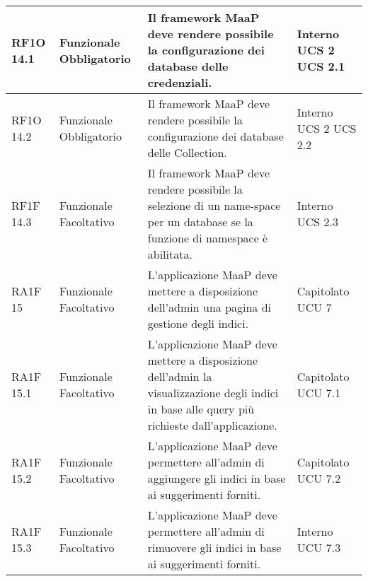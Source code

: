 \begin{center}
\begin{longtable}{ | l | p{2cm} | p{5cm} | p{1.7cm} |}
        RF1O 14.1 & Funzionale \newline  Obbligatorio  & Il framework MaaP deve rendere possibile la configurazione dei database delle credenziali. &  Interno \newline  UCS 2 \newline  UCS 2.1 \newline  \\ \hline      
        RF1O 14.2 & Funzionale \newline  Obbligatorio  & Il framework MaaP deve rendere possibile la configurazione dei database delle Collection. &  Interno \newline  UCS 2 \newline  UCS 2.2 \newline  \\ \hline      
        RF1F 14.3 & Funzionale \newline  Facoltativo  & Il framework MaaP deve rendere possibile la selezione di un name-space per un database se la funzione di namespace è abilitata. &  Interno \newline  UCS 2.3 \newline  \\ \hline      
        RA1F 15 & Funzionale \newline  Facoltativo  & L’applicazione MaaP deve mettere a disposizione dell’admin una pagina di gestione degli indici. &  Capitolato \newline  UCU 7 \newline  \\ \hline      
        RA1F 15.1 & Funzionale \newline  Facoltativo  & L’applicazione MaaP deve mettere a disposizione dell’admin la visualizzazione degli indici in base alle query più richieste dall’applicazione. &  Capitolato \newline  UCU 7.1 \newline  \\ \hline      
        RA1F 15.2 & Funzionale \newline  Facoltativo  & L’applicazione MaaP deve permettere all’admin di aggiungere gli indici in base ai suggerimenti forniti. &  Capitolato \newline  UCU 7.2 \newline  \\ \hline      
        RA1F 15.3 & Funzionale \newline  Facoltativo  & L’applicazione MaaP deve permettere all’admin di rimuovere gli indici in base ai suggerimenti forniti. &  Interno \newline  UCU 7.3 \newline  \\ \hline      

\end{longtable}
\end{center}
